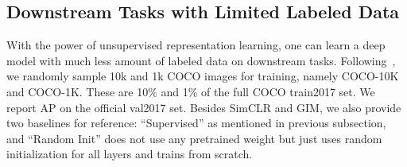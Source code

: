 \begin{table}
\vspace{-0.4in}
\begin{minipage}[t]{1.0\linewidth}
\centering
{}
\vspace{0.1in}
\caption{Mask R-CNN results on 10K COCO images and 1K COCO images}
\label{tab:semi_det_results}
\vspace{-0.3in}
\end{minipage}
\end{table}

\fi

\subsection{Downstream Tasks with Limited Labeled Data} 
With the power of unsupervised representation learning, one can learn a deep model with much less
amount of labeled data on downstream tasks. Following~\cite{he2019rethinking}, we randomly sample
10k and 1k  COCO images for training, namely COCO-10K and COCO-1K. These are 10\% and 1\% of the
full COCO train2017 set. We report AP on the official val2017 set. Besides SimCLR and GIM, we also
provide two baselines for reference: ``Supervised'' as mentioned in previous subsection, and
``Random Init'' does not use any pretrained weight but just uses random initialization for all
layers and trains from scratch.

